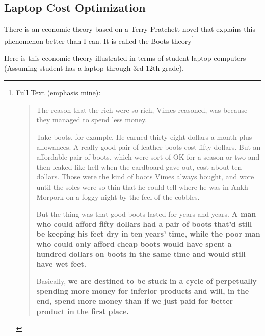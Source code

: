 \documentclass[14pt, letterpaper,twoside]{extreport}
\begin{document}
\pagebreak \hypertarget{optimizing-cost-with-performance}{%
\subsection*{Laptop Cost Optimization}\label{optimizing-cost-with-performance}}



There is an economic theory based on a Terry Pratchett novel that explains this phenomenon better than I can. It is called the \href{https://en.wikipedia.org/wiki/Boots_theory}{Boots theory}\footnote{Full Text (emphasis mine): 
\begin{quote}The reason that the rich were so rich, Vimes reasoned, was because they managed to spend less money.

Take boots, for example. He earned thirty-eight dollars a month plus allowances. A really good pair of leather boots cost fifty dollars. But an affordable pair of boots, which were sort of OK for a season or two and then leaked like hell when the cardboard gave out, cost about ten dollars. Those were the kind of boots Vimes always bought, and wore until the soles were so thin that he could tell where he was in Ankh-Morpork on a foggy night by the feel of the cobbles.

But the thing was that good boots lasted for years and years. \textbf{A man who could afford fifty dollars had a pair of boots that’d still be keeping his feet dry in ten years’ time, while the poor man who could only afford cheap boots would have spent a hundred dollars on boots in the same time and would still have wet feet.}

Basically, \textbf{we are destined to be stuck in a cycle of perpetually spending more money for inferior products and will, in the end, spend more money than if we just paid for better product in the first place.}
\end{quote} }

\hfill \break Here is this economic theory illustrated in terms of student laptop computers (Assuming student has a laptop through 3rd-12th grade).
\end{document}
